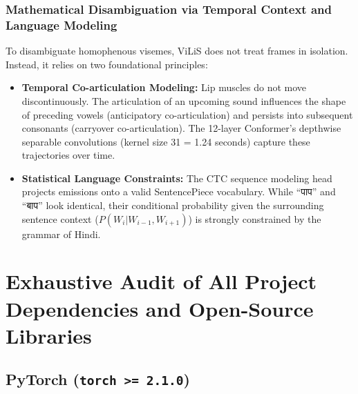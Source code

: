 \documentclass[11pt,a4paper]{report}
\begin{document}
\subsection{Mathematical Disambiguation via Temporal Context and Language Modeling}
To disambiguate homophenous visemes, ViLiS does not treat frames in isolation. Instead, it relies on two foundational principles:
\begin{itemize}
    \item \textbf{Temporal Co-articulation Modeling:} Lip muscles do not move discontinuously. The articulation of an upcoming sound influences the shape of preceding vowels (anticipatory co-articulation) and persists into subsequent consonants (carryover co-articulation). The 12-layer Conformer’s depthwise separable convolutions (kernel size 31 = 1.24 seconds) capture these trajectories over time.
    \item \textbf{Statistical Language Constraints:} The CTC sequence modeling head projects emissions onto a valid SentencePiece vocabulary. While ``पाप'' and ``बाप'' look identical, their conditional probability given the surrounding sentence context ($P(W_i | W_{i-1}, W_{i+1})$) is strongly constrained by the grammar of Hindi.
\end{itemize}

\chapter{Exhaustive Audit of All Project Dependencies and Open-Source Libraries}

\section{PyTorch (\texttt{torch >= 2.1.0})}
\end{document}
